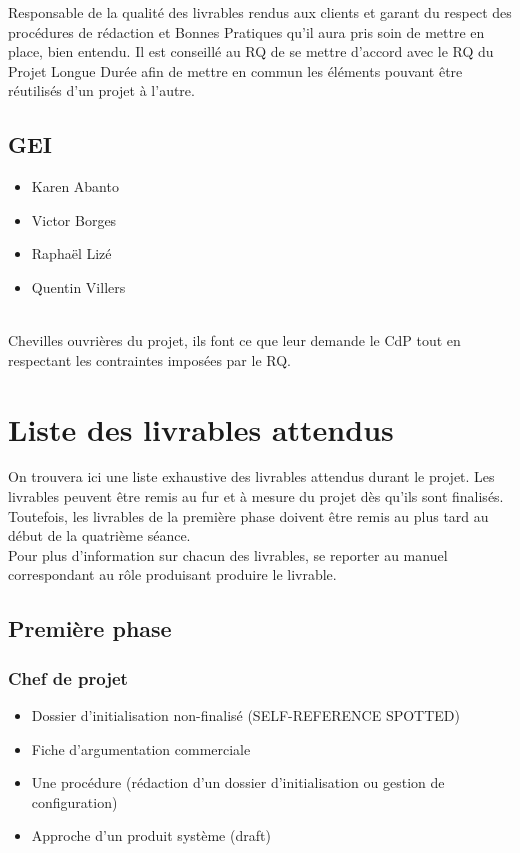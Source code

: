 \documentclass[twoside]{article}
\begin{document}
Responsable de la qualité des livrables rendus aux clients et garant du respect
des procédures de rédaction et Bonnes Pratiques qu'il aura pris soin de mettre
en place, bien entendu. Il est conseillé au RQ de se mettre d'accord avec le RQ
du Projet Longue Durée afin de mettre en commun les éléments pouvant être
réutilisés d'un projet à l'autre.


\subsection{GEI}

\begin{itemize}
\item Karen Abanto
\item Victor Borges
\item Raphaël Lizé
\item Quentin Villers
\end{itemize}

\hfill\\

Chevilles ouvrières du projet, ils font ce que leur demande le CdP tout en
respectant les contraintes imposées par le RQ.


\section{Liste des livrables attendus}

On trouvera ici une liste exhaustive des livrables attendus durant le projet.
Les livrables peuvent être remis au fur et à mesure du projet dès qu'ils
sont finalisés. Toutefois, les livrables de la première phase doivent être
remis au plus tard au début de la quatrième séance.\\
Pour plus d'information sur chacun des livrables, se reporter au manuel
correspondant au rôle produisant produire le livrable.


\subsection{Première phase}

\subsubsection{Chef de projet}

\begin{itemize}
\item Dossier d'initialisation non-finalisé (SELF-REFERENCE SPOTTED)
\item Fiche d'argumentation commerciale
\item Une procédure (rédaction d'un dossier d'initialisation ou gestion de
configuration)
\item Approche d'un produit système (draft)
\end{itemize}
\end{document}
